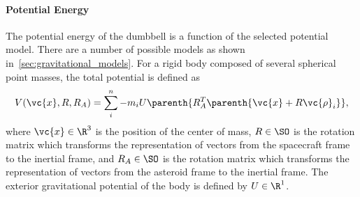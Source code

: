 \paragraph{Potential Energy}
The potential energy of the dumbbell is a function of the selected potential model.
There are a number of possible models as shown in~\cref{sec:gravitational_models}.
For a rigid body composed of several spherical point masses, the total potential is defined as
\begin{align}\label{eq:inertial_potential_energy}
    V(\vc{x}, R, R_A) = \sum_{i}^n - m_i U \parenth{R_A^T \parenth{\vc{x} + R \vc{\rho}_i}},
\end{align}
where \( \vc{x} \in \R^3\) is the position of the center of mass, \( R \in \SO\) is the rotation matrix which transforms the representation of vectors from the spacecraft frame to the inertial frame, and \( R_A \in \SO \) is the rotation matrix which transforms the representation of vectors from the asteroid frame to the inertial frame.
The exterior gravitational potential of the body is defined by \( U \in \R^1 \).

